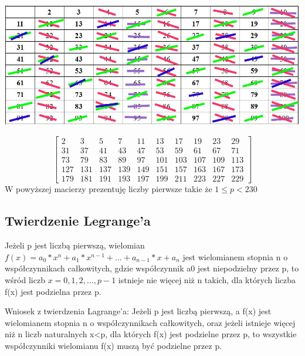 \documentclass{article}
\begin{document}
\begin{krok} \includegraphics[scale=0.4]{6.jpg} \end{krok}

$$\left[\begin{array}{cccccccccc}
2&3&5&7&11&13&17&19&23&29\\
31&37&41&43&47&53&59&61&67&71\\
73&79&83&89&97&101&103&107&109&113\\
127&131&137&139&149&151&157&163&167&173\\
179&181&191&193&197&199&211&223&227&229
\end{array}\right]$$
W powyższej macierzy prezentuję liczby pierwsze takie że \( 1\leq p < 230 \)

\subsection{Twierdzenie Legrange'a}

\begin{twierdzenie}
Jeżeli p jest liczbą pierwszą, wielomian \(f(x)=a_{0}*x^{n}+a_{1}*x^{n-1}+\ldots+a_{n-1}*x+a_{n}\) jest wielomianem stopnia n o współczynnikach całkowitych, gdzie współczynnik a0 jest niepodzielny przez p, to wśród liczb \(x=0,1,2,\ldots,p-1\) istnieje nie więcej niż n takich, dla których liczba f(x) jest podzielna przez p.\cite{wiki}
\end{twierdzenie}

Wniosek z twierdzenia Lagrange'a:
Jeżeli p jest liczbą pierwszą, a f(x) jest wielomianem stopnia n o współczynnikach całkowitych, oraz jeżeli istnieje więcej niż n liczb naturalnych x<p, dla których f(x) jest podzielne przez p, to wszystkie współczynniki wielomianu f(x) muszą być podzielne przez p.
\end{document}
